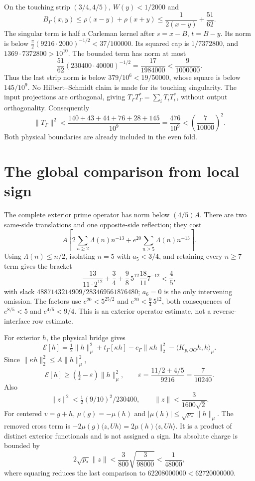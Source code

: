 \documentclass[11pt,a4paper]{article}
\numberwithin{equation}{section}
\theoremstyle{remark}\newtheorem{remark}[theorem]{Remark}
\newcommand{\E}{\mathcal E}\newcommand{\D}{\mathcal D}
\newcommand{\tg}{t_\Gamma}\newcommand{\cg}{c_\Gamma}
\newcommand{\norm}[1]{\lVert#1\rVert}\newcommand{\abs}[1]{\lvert#1\rvert}
\newcommand{\ip}[2]{\langle#1,#2\rangle}\newcommand{\dd}{\mathop{}\!\mathrm d}
\begin{document}
On the touching strip $(3/4,4/5)$, $W(y)<1/2000$ and
\[
 B_\Gamma(x,y)\le\rho(x-y)+\rho(x+y)
 \le\frac1{2(x-y)}+\frac{51}{62}.
\]
The singular term is half a Carleman kernel after $s=x-B$, $t=B-y$.
Its norm is below
$\frac\pi2(9216\cdot2000)^{-1/2}<37/100000$.
Its squared cap is $1/7372800$, and $1369\cdot7372800>10^{10}$.
The bounded term has norm at most
\[
 \frac{51}{62}(230400\cdot40000)^{-1/2}
 =\frac{17}{1984000}<\frac9{1000000}.
\]
Thus the last strip norm is below $379/10^6<19/50000$, whose square is below $145/10^9$.
No Hilbert--Schmidt claim is made for its touching singularity.
The input projections are orthogonal, giving
$T_\Gamma T_\Gamma^*=\sum_iT_iT_i^*$, without output orthogonality.
Consequently
\begin{equation}\label{eq:gammaremainnorm}
 \norm{T_\Gamma}^2<\frac{140+43+44+76+28+145}{10^9}
 =\frac{476}{10^9}<\left(\frac7{10000}\right)^2.
\end{equation}
Both physical boundaries are already included in the even fold.

\section{The global comparison from local sign}\label{sec:firstproof}
The complete exterior prime operator has norm below $(4/5)A$.
There are two same-side translations and one opposite-side reflection; they cost
\[
 A\left[2\sum_{n\ge2}\Lambda(n)n^{-13}
 +e^{20}\sum_{n\ge5}\Lambda(n)n^{-13}\right].
\]
Using $\Lambda(n)\le n/2$, isolating $n=5$ with $a_5<3/4$, and retaining every $n\ge7$ term gives the bracket
\[
 \frac{13}{11\cdot2^{12}}+\frac34+
 \frac98\,5^{12}\frac{18}{11}7^{-12}<\frac45,
\]
with slack $4887143214909/283469561876480$; $a_6=0$ is the only intervening omission.
The factors use $e^{20}<5^{25/2}$ and $e^{20}<\frac94\,5^{12}$, both consequences of $e^{8/5}<5$ and $e^{4/5}<9/4$.
This is an exterior operator estimate, not a reverse-interface row estimate.

For exterior $h$, the physical bridge gives
\[
 \E[h]=\tfrac12\norm h_\mu^2+\tg[\kappa h]-\cg\norm{\kappa h}_2^2
 -\ip{K_{p,OO}h}{h}_\mu.
\]
Since $\norm{\kappa h}_2^2\le A\norm h_\mu^2$,
\begin{equation}\label{eq:exteriorenergy}
 \E[h]\ge(\tfrac12-\varepsilon)\norm h_\mu^2,\qquad
 \varepsilon=\frac{11/2+4/5}{9216}=\frac7{10240}.
\end{equation}
Also
\[
 \norm z^2<\tfrac12(9/10)^2/230400,\qquad
 \norm z<\frac3{1600\sqrt2}.
\]
For centered $v=g+h$, $\mu(g)=-\mu(h)$ and
$|\mu(h)|\le\sqrt{p_*}\norm h_\mu$.
The removed cross term is
$-2\mu(g)\ip z{Uh}=2\mu(h)\ip z{Uh}$.
It is a product of distinct exterior functionals and is not assigned a sign.
Its absolute charge is bounded by
\begin{equation}\label{eq:rankcharge}
 2\sqrt{p_*}\norm z<\frac3{800}\sqrt{\frac3{98000}}<\frac1{48000},
\end{equation}
where squaring reduces the last comparison to $62208000000<62720000000$.
\end{document}
